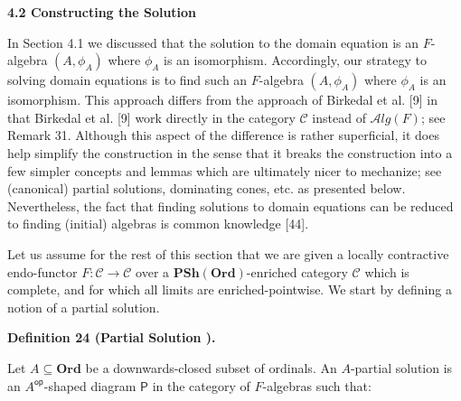  
 
 
 
\par\medskip\noindent\textbf{4.2 Constructing the Solution}\par
 
 
In Section 4.1 we discussed that the solution to the domain equation is an $F$-algebra $(A,\phi_{A})$ where $\phi_{A}$ is an isomorphism. Accordingly, our strategy to solving domain equations is to find such an $F$-algebra $(A,\phi_{A})$ where $\phi_{A}$ is an isomorphism. This approach differs from the approach of Birkedal et al. [9] in that Birkedal et al. [9] work directly in the category $\mathcal{C}$ instead of $\mathcal{A}lg(F)$; see Remark 31. Although this aspect of the difference is rather superficial, it does help simplify the construction in the sense that it breaks the construction into a few simpler concepts and lemmas which are ultimately nicer to mechanize; see (canonical) partial solutions, dominating cones, etc. as presented below. Nevertheless, the fact that finding solutions to domain equations can be reduced to finding (initial) algebras is common knowledge [44].\par
 
 
 
Let us assume for the rest of this section that we are given a locally contractive endo-functor $F:\mathcal{C}\to\mathcal{C}$ over a $\mathbf{PSh}(\mathbf{Ord})$-enriched category $\mathcal{C}$ which is complete, and for which all limits are enriched-pointwise. We start by defining a notion of a partial solution.\par
 
 
 
\par\medskip\noindent\textbf{Definition 24 (Partial Solution ).}\par
 
 
Let $A\subseteq\mathbf{Ord}$ be a downwards-closed subset of ordinals. An $A$-partial solution is an ${A}^{\mathsf{op}}$-shaped diagram $\boldsymbol{\mathsf{P}}$ in the category of $F$-algebras such that:\par
  
